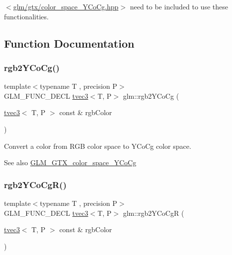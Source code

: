 $<$\hyperlink{color__space__YCoCg_8hpp}{glm/gtx/color\+\_\+space\+\_\+\+Y\+Co\+Cg.\+hpp}$>$ need to be included to use these functionalities. 

\subsection{Function Documentation}
\mbox{\label{group__gtx__color__space__YCoCg_ga19481f6947c5b5482debd41e71b8c941}} 
\subsubsection{\texorpdfstring{rgb2\+Y\+Co\+Cg()}{rgb2YCoCg()}}
{\footnotesize\ttfamily template$<$typename T , precision P$>$ \\
G\+L\+M\+\_\+\+F\+U\+N\+C\+\_\+\+D\+E\+CL \hyperlink{structglm_1_1tvec3}{tvec3}$<$T, P$>$ glm\+::rgb2\+Y\+Co\+Cg (\begin{DoxyParamCaption}\item[{\hyperlink{structglm_1_1tvec3}{tvec3}$<$ T, P $>$ const \&}]{rgb\+Color }\end{DoxyParamCaption})}

Convert a color from R\+GB color space to Y\+Co\+Cg color space. \begin{DoxySeeAlso}{See also}
\hyperlink{group__gtx__color__space__YCoCg}{G\+L\+M\+\_\+\+G\+T\+X\+\_\+color\+\_\+space\+\_\+\+Y\+Co\+Cg} 
\end{DoxySeeAlso}
\mbox{\label{group__gtx__color__space__YCoCg_ga2e534594cc8ad252d23b14fb363ae9e2}} 
\subsubsection{\texorpdfstring{rgb2\+Y\+Co\+Cg\+R()}{rgb2YCoCgR()}}
{\footnotesize\ttfamily template$<$typename T , precision P$>$ \\
G\+L\+M\+\_\+\+F\+U\+N\+C\+\_\+\+D\+E\+CL \hyperlink{structglm_1_1tvec3}{tvec3}$<$T, P$>$ glm\+::rgb2\+Y\+Co\+CgR (\begin{DoxyParamCaption}\item[{\hyperlink{structglm_1_1tvec3}{tvec3}$<$ T, P $>$ const \&}]{rgb\+Color }\end{DoxyParamCaption})}

